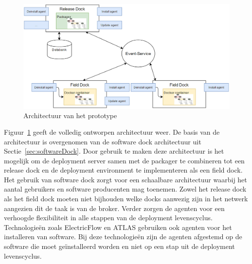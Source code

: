 \begin{figure}
\includegraphics[width=\textwidth,height=\textheight,keepaspectratio]{afbeelding/architectuur.png}
\centering
\caption{Architectuur van het prototype}
\label{fig:architectuur}
\end{figure}

Figuur~\ref{fig:architectuur} geeft de volledig ontworpen architectuur weer.
De basis van de architectuur is overgenomen van de software dock architectuur uit Sectie~\ref{sec:softwareDock}.
Door gebruik te maken deze architectuur is het mogelijk om de deployment server samen met de packager te combineren tot een release dock en de deployment environment te implementeren als een field dock. 
Het gebruik van software dock zorgt voor een schaalbare architectuur waarbij het aantal gebruikers en software producenten mag toenemen.
Zowel het release dock als het field dock moeten niet bijhouden welke docks aanwezig zijn in het netwerk aangezien dit de taak is van de broker.
Verder zorgen de agenten voor een verhoogde flexibiliteit in alle stappen van de deployment levenscyclus.
Technologieën zoals ElectricFlow en ATLAS gebruiken ook agenten voor het installeren van software.
Bij deze technologieën zijn de agenten afgestemd op de software die moet geïnstalleerd worden en niet op een stap uit de deployment levenscyclus.

